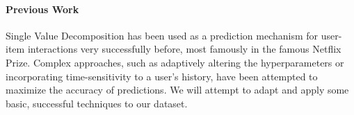 \documentclass[12pt]{article}
\begin{document}

\paragraph{Previous Work} Single Value Decomposition has been used as a prediction mechanism for user-item interactions very successfully before, most famously in the famous Netflix Prize.\textsuperscript{\cite{gower}} Complex approaches, such as adaptively altering the hyperparameters or incorporating time-sensitivity to a user's history, have been attempted to maximize the accuracy of predictions.\textsuperscript{\cite{ma}}\textsuperscript{\cite{gower}} We will attempt to adapt and apply some basic, successful techniques to our dataset.
\end{document}
